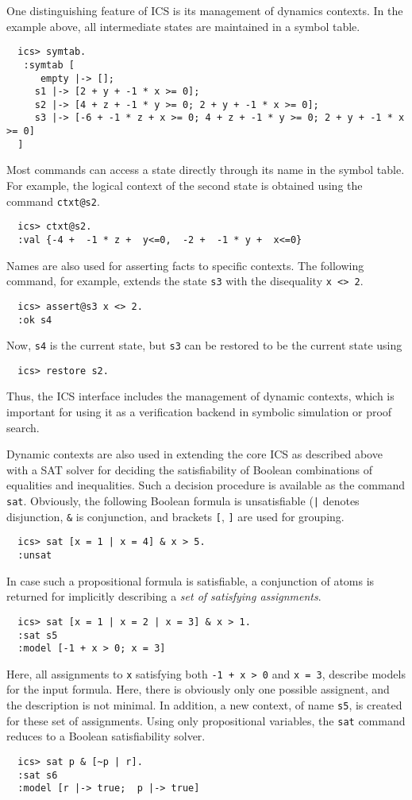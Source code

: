 \documentclass[12pt]{article}
\begin{document}
One distinguishing feature of ICS is its management of dynamics contexts.
In the example above, all intermediate states are maintained in a symbol
table.
  \begin{verbatim}
  ics> symtab.
   :symtab [
      empty |-> []; 
     s1 |-> [2 + y + -1 * x >= 0]; 
     s2 |-> [4 + z + -1 * y >= 0; 2 + y + -1 * x >= 0]; 
     s3 |-> [-6 + -1 * z + x >= 0; 4 + z + -1 * y >= 0; 2 + y + -1 * x >= 0]
  ]
  \end{verbatim}
Most commands can access a state directly through its name in the symbol table.
For example, the logical context of the second state is obtained using the command
{\tt ctxt@s2}.
  \begin{verbatim}
  ics> ctxt@s2.
  :val {-4 +  -1 * z +  y<=0,  -2 +  -1 * y +  x<=0}
  \end{verbatim}
Names are also used for asserting facts to specific contexts. The following
command, for example, extends the state {\tt s3} with the disequality {\tt x <> 2}\@.
  \begin{verbatim}
  ics> assert@s3 x <> 2.
  :ok s4
  \end{verbatim}
Now, {\tt s4} is the current state, but {\tt s3} can be restored to be the
current state using
  \begin{verbatim}
  ics> restore s2.
  \end{verbatim}
Thus, the ICS interface includes the management of dynamic contexts, which
is important for using it as a verification backend in symbolic simulation
or proof search.  

Dynamic contexts are also used in extending the core ICS
as described above with a SAT solver for deciding the 
satisfiability of Boolean combinations of equalities and inequalities.
Such a decision procedure is available as the command {\tt sat}\@.
Obviously, the following Boolean formula is unsatisfiable ({\tt |}
denotes disjunction, {\tt \&} is conjunction, and brackets 
{\tt [}, {\tt]} are used for grouping. 
  \begin{verbatim}
  ics> sat [x = 1 | x = 4] & x > 5.
  :unsat
  \end{verbatim}
In case such a propositional formula is satisfiable, a conjunction of 
atoms is returned for implicitly describing a {\em set of satisfying assignments}\@.
  \begin{verbatim}
  ics> sat [x = 1 | x = 2 | x = 3] & x > 1.
  :sat s5 
  :model [-1 + x > 0; x = 3]
  \end{verbatim}
Here, all assignments to {\tt x} satisfying both {\tt -1 + x > 0}
and {\tt x = 3}, describe models for the input formula.  Here, there
is obviously only one possible assignent, and the description is not minimal.
In addition, a new context, of name {\tt s5}, is created for these set of assignments. 
Using only propositional variables, the {\tt sat} command reduces to a Boolean
satisfiability solver.
  \begin{verbatim}
  ics> sat p & [~p | r].
  :sat s6 
  :model [r |-> true;  p |-> true]
  \end{verbatim}
\end{document}
